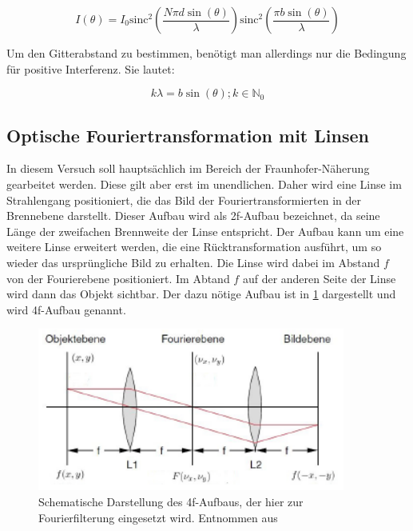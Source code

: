 \begin{equation}
I(\theta) = I_0 \text{sinc}^2\left( \frac{N\pi d \sin(\theta)}{\lambda}\right)  \text{sinc}^2\left( \frac{\pi b \sin(\theta)}{\lambda}\right) 
\label{eq:beugung}
\end{equation}

Um den Gitterabstand zu bestimmen, benötigt man allerdings nur die Bedingung für positive Interferenz. Sie lautet:

\begin{equation}
	k \lambda = b \sin(\theta); k\in \mathbb{N}_0
\end{equation}

\subsection{Optische Fouriertransformation mit Linsen}
In diesem Versuch soll hauptsächlich im Bereich der Fraunhofer-Näherung gearbeitet werden. Diese gilt aber erst im unendlichen. Daher wird eine Linse im Strahlengang positioniert, die das Bild der Fouriertransformierten in der Brennebene darstellt. Dieser Aufbau wird als 2f-Aufbau bezeichnet, da seine Länge der zweifachen Brennweite der Linse entspricht. Der Aufbau kann um eine weitere Linse erweitert werden, die eine Rücktransformation ausführt, um so wieder das ursprüngliche Bild zu erhalten. Die Linse wird dabei im Abstand $f$ von der Fourierebene positioniert. Im Abtand $f$ auf der anderen Seite der Linse wird dann das Objekt sichtbar. Der dazu nötige Aufbau ist in \cref{4f} dargestellt und wird 4f-Aufbau genannt.

\begin{figure}[h!]
	\centering
	\includegraphics[width=0.9\textwidth]{4f.png}
	\caption{Schematische Darstellung des 4f-Aufbaus, der hier zur Fourierfilterung eingesetzt wird. Entnommen aus \cite[6]{anleitung-ws2014}}
	\label{4f}
\end{figure}

